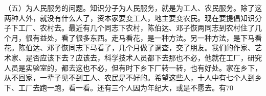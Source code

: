 （五）为人民服务的问题。知识分子为人民服务，就是为工人、农民服务。除了这两种人外，就没有什么人了，资本家要变工人，地主要变农民。现在要提倡知识分子下工厂、农村去。最近有几个同志下农村，陈伯达、邓子恢两同志到农村住了几个月，很有益处，看了很多东西。走马看花，是一种方法。另一种方法，是下马看花。陈伯达、邓子恢同志下马看了，几个月做了调查，交了朋友。我们的作家、艺术家、是否应该下去？应该去，科学技术人员都下去那也不必，他就在工厂，研究人员是实验室的，都去这也不必，但有时下乡下厂转一转，也有好处。家在乡下，从不回家，一辈子见不到工人、农民是不好的。希望这些人，十人中有七个人到乡下、工厂去跑一跑，看一看。还有三个人因为年纪大，或是不愿去。有70%